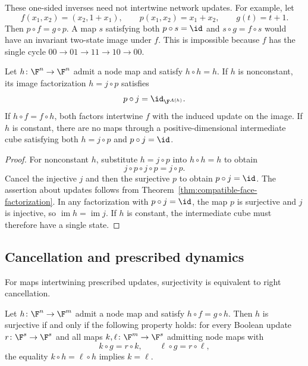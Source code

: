These one-sided inverses need not intertwine network updates. For example, let
\[
    f(x_1,x_2)=(x_2,1+x_1),\qquad p(x_1,x_2)=x_1+x_2,
    \qquad g(t)=t+1.
\]
Then $p\circ f=g\circ p$. A map $s$ satisfying both $p\circ s=\id$ and $s\circ g=f\circ s$ would have an invariant two-state image under $f$. This is impossible because $f$ has the single cycle $00\to01\to11\to10\to00$.

\begin{proposition}\label{prop:node-map-retractions}
Let $h\colon\F^n\to\F^n$ admit a node map and satisfy $h\circ h=h$. If $h$ is nonconstant, its image factorization $h=j\circ p$ satisfies
\[
    p\circ j=\id_{\F^{A(h)}}.
\]
If $h\circ f=f\circ h$, both factors intertwine $f$ with the induced update on the image. If $h$ is constant, there are no maps through a positive-dimensional intermediate cube satisfying both $h=j\circ p$ and $p\circ j=\id$.
\end{proposition}

\begin{proof}
For nonconstant $h$, substitute $h=j\circ p$ into $h\circ h=h$ to obtain
\[
    j\circ p\circ j\circ p=j\circ p.
\]
Cancel the injective $j$ and then the surjective $p$ to obtain $p\circ j=\id$. The assertion about updates follows from Theorem~\ref{thm:compatible-face-factorization}. In any factorization with $p\circ j=\id$, the map $p$ is surjective and $j$ is injective, so $\operatorname{im}h=\operatorname{im}j$. If $h$ is constant, the intermediate cube must therefore have a single state.
\end{proof}

\subsection{Cancellation and prescribed dynamics}\label{subsec:node-map-cancellation}

For maps intertwining prescribed updates, surjectivity is equivalent to right cancellation.

\begin{proposition}\label{prop:dynamic-right-cancellation}
Let $h\colon\F^n\to\F^m$ admit a node map and satisfy $h\circ f=g\circ h$. Then $h$ is surjective if and only if the following property holds: for every Boolean update $r\colon\F^s\to\F^s$ and all maps $k,\ell\colon\F^m\to\F^s$ admitting node maps with
\[
    k\circ g=r\circ k,\qquad \ell\circ g=r\circ\ell,
\]
the equality $k\circ h=\ell\circ h$ implies $k=\ell$.
\end{proposition}


